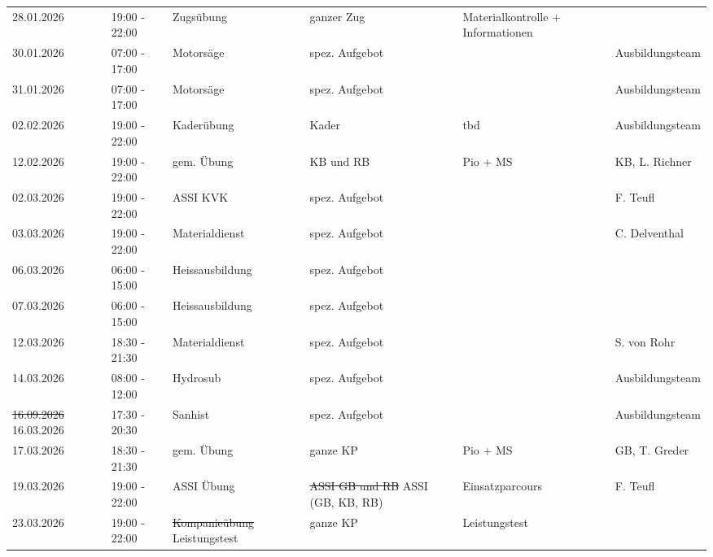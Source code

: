 \documentclass[11pt,a4paper]{article}
\begin{document}
\begin{adjustwidth}{1.5cm}{1.5cm}
\begin{longtable}{llllll}
28.01.2026 & 19:00 - 22:00 & Zugs\"ubung & ganzer Zug & \color{OliveGreen}Materialkontrolle + Informationen & \color{OliveGreen} \\
\color{OliveGreen}30.01.2026 & \color{OliveGreen}07:00 - 17:00 & \color{OliveGreen}Motors\"age & \color{OliveGreen}spez. Aufgebot & \color{OliveGreen} & \color{OliveGreen}Ausbildungsteam \\
31.01.2026 & 07:00 - 17:00 & Motors\"age & spez. Aufgebot & \color{OliveGreen} & \color{OliveGreen}Ausbildungsteam \\
02.02.2026 & 19:00 - 22:00 & Kader\"ubung & Kader & \color{OliveGreen}tbd & \color{OliveGreen}Ausbildungsteam \\
12.02.2026 & 19:00 - 22:00 & gem. \"Ubung & KB und RB & \color{OliveGreen}Pio + MS & \color{OliveGreen}KB, L. Richner \\
02.03.2026 & 19:00 - 22:00 & ASSI KVK & spez. Aufgebot & \color{OliveGreen} & \color{OliveGreen}F. Teufl \\
03.03.2026 & 19:00 - 22:00 & Materialdienst & spez. Aufgebot & \color{OliveGreen} & \color{OliveGreen}C. Delventhal \\
\color{OliveGreen}06.03.2026 & \color{OliveGreen}06:00 - 15:00 & \color{OliveGreen}Heissausbildung & \color{OliveGreen}spez. Aufgebot & \color{OliveGreen} & \color{OliveGreen} \\
\color{OliveGreen}07.03.2026 & \color{OliveGreen}06:00 - 15:00 & \color{OliveGreen}Heissausbildung & \color{OliveGreen}spez. Aufgebot & \color{OliveGreen} & \color{OliveGreen} \\
12.03.2026 & 18:30 - 21:30 & Materialdienst & spez. Aufgebot & \color{OliveGreen} & \color{OliveGreen}S. von Rohr \\
14.03.2026 & 08:00 - 12:00 & Hydrosub & spez. Aufgebot & \color{OliveGreen} & \color{OliveGreen}Ausbildungsteam \\
\color{BrickRed}\sout{16.09.2026} \color{OliveGreen}16.03.2026 & 17:30 - 20:30 & Sanhist & spez. Aufgebot & \color{OliveGreen} & \color{OliveGreen}Ausbildungsteam \\
17.03.2026 & 18:30 - 21:30 & gem. \"Ubung & ganze KP & \color{OliveGreen}Pio + MS & \color{OliveGreen}GB, T. Greder \\
19.03.2026 & 19:00 - 22:00 & ASSI \"Ubung & \color{BrickRed}\sout{ASSI GB und RB} \color{OliveGreen}ASSI (GB, KB, RB) & \color{OliveGreen}Einsatzparcours & \color{OliveGreen}F. Teufl \\
23.03.2026 & 19:00 - 22:00 & \color{BrickRed}\sout{Kompanie\"ubung} \color{OliveGreen}Leistungstest & ganze KP & \color{OliveGreen}Leistungstest & \color{OliveGreen} \\

\end{longtable}
\end{adjustwidth}
\end{document}
